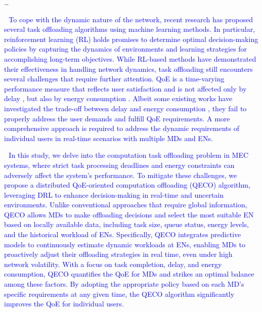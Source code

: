 \documentclass[12pt,draftclsnofoot,onecolumn]{IEEEtran}
\newcommand{\rev}[1]{{\color{blue}#1}} %
\newcommand{\rev}[1]{#1}
\newenvironment{my}[2]%
{\begin{list}{}%
{\setlength{\rightmargin}{#1}\setlength{\leftmargin}{#2}}%


 \item[]{}

} {\end{list}}
\begin{document}
\begin{enumerate}
\begin{my}{1cm}{1cm}
	\rev{ 
	
	\dots

\textcolor{blue}{\,\,\,\,To cope with the dynamic nature of the network, recent research has proposed several task offloading algorithms using machine learning methods. In particular, reinforcement learning (RL) \cite{mnih2015human} holds promises to determine optimal decision-making policies by capturing the dynamics of environments and learning strategies for accomplishing long-term objectives.
	While RL-based methods have demonstrated their effectiveness in handling network dynamics, task offloading still encounters several challenges that require further attention. 
	QoE is a time-varying performance measure that reflects user satisfaction and is not affected only by delay \cite{guo2022energy}, but also by energy consumption \cite{tang2022uav}. Albeit some existing works have investigated the trade-off between delay and energy consumption \cite{li2022joint}, they fail to properly address the user demands and fulfill QoE requirements. A more comprehensive approach is required to address the dynamic requirements of individual users in real-time scenarios with multiple MDs and ENs.} \vspace{2mm}




\textcolor{blue}{\,\,\,\,In this study, we delve into the computation task offloading problem in MEC systems, where strict task processing deadlines and energy constraints can adversely affect the system's performance. To mitigate these challenges, we propose a distributed QoE-oriented computation offloading (QECO) algorithm, leveraging DRL to enhance decision-making in real-time and uncertain environments. Unlike conventional approaches that require global information, QECO allows MDs to make offloading decisions and select the most suitable EN based on locally available data, including task size, queue status, energy levels, and the historical workload of ENs. Specifically, QECO integrates predictive models to continuously estimate dynamic workloads at ENs, enabling MDs to proactively adjust their offloading strategies in real time, even under high network volatility. With a focus on task completion, delay, and energy consumption, QECO quantifies the QoE for MDs and strikes an optimal balance among these factors. By adopting the appropriate policy based on each MD’s specific requirements at any given time, the QECO algorithm significantly improves the QoE for individual users.}

}
\end{my}
\end{enumerate}
\end{document}
